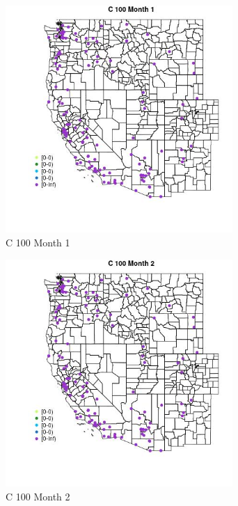 \begin{figure} 
\centering  
\includegraphics[width=0.77\textwidth]{Code_Outputs/Report_ML_input_PM25_Step4_part_e_de_duplicated_aves_MapObsMo1C_100.jpg} 
\caption{\label{fig:Report_ML_input_PM25_Step4_part_e_de_duplicated_avesMapObsMo1C_100}C 100 Month 1} 
\end{figure} 
 

\begin{figure} 
\centering  
\includegraphics[width=0.77\textwidth]{Code_Outputs/Report_ML_input_PM25_Step4_part_e_de_duplicated_aves_MapObsMo2C_100.jpg} 
\caption{\label{fig:Report_ML_input_PM25_Step4_part_e_de_duplicated_avesMapObsMo2C_100}C 100 Month 2} 
\end{figure} 
 

